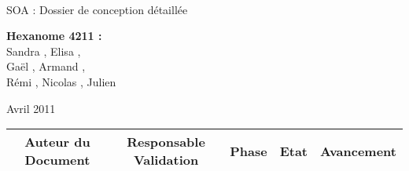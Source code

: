 \documentclass[a4paper]{article}
\begin{document}
\begin{titlepage}
~ 
\vfill
	\begin{center}
		\begin{Huge}
		SOA : Dossier de conception détaillée\\
		\end{Huge} 
\vfill
		\textbf{Hexanome 4211 :} 
		\\Sandra {}, Elisa , 
		\\Gaël , Armand , 
		\\Rémi , Nicolas , Julien \\

\vfill		
		\begin{Large}
		Avril 2011
		\end{Large}
\vfill
	\begin{tabular}{|c|c|c|c|c|}
 	 \hline
 	 Auteur du Document & Responsable Validation & Phase & Etat & Avancement \\
 	 \hline
 	 
 	\hline
 	
	\end{tabular}
\vfill	
	\end{center}
\vfill
\end{titlepage}

\newpage
\tableofcontents
\newpage



\end{document}
